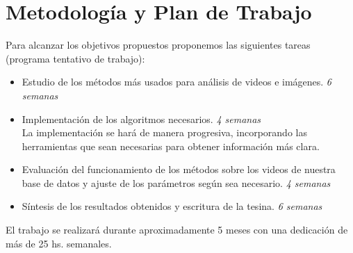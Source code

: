 \section{Metodología y Plan de Trabajo}
\iffalse
Se recomienda estructurar esta sección en función de los objetivos específicos.
* Planteo de la hipotesis a analizar en cada objetivo o seccion del proyecto.
* Actividades propuestas y metodologıa a usar en cada una de ellas.
* Resultados que se esperan obtener o metas a cumplir y como se evaluaran
los resultados.
Trate de evaluar los potenciales problemas y limitaciones de la metodolog ́ıa
y t ́ecnicas propuestas y en lo posible proponer alternativas.
\fi

Para alcanzar los objetivos propuestos proponemos las siguientes tareas (programa tentativo de trabajo):
\begin{itemize}
  \item Estudio de los métodos más usados para análisis de videos e imágenes. \textit{6 semanas}
  \item Implementación de los algoritmos necesarios. \textit{4 semanas}
    \\ La implementación se hará de manera progresiva, incorporando las herramientas que
    sean necesarias para obtener información más clara.
  \item Evaluación del funcionamiento de los métodos sobre los videos de nuestra base de datos y
  ajuste de los parámetros según sea necesario. \textit{4 semanas}
  \item Síntesis de los resultados obtenidos y escritura de la tesina. \textit{6 semanas}
\end{itemize}
El trabajo se realizará durante aproximadamente 5 meses con una dedicación de más de 25 hs. semanales.

